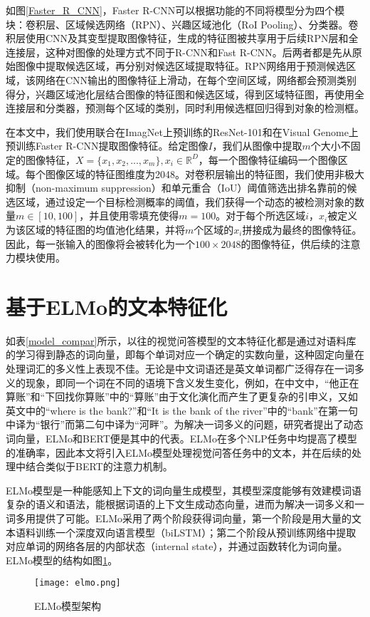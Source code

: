如图\ref{Faster_R_CNN}，Faster R-CNN可以根据功能的不同将模型分为四个模块：卷积层、区域候选网络（RPN）、兴趣区域池化（RoI Pooling）、分类器。卷积层使用CNN及其变型提取图像特征，生成的特征图被共享用于后续RPN层和全连接层，这种对图像的处理方式不同于R-CNN和Fast R-CNN。后两者都是先从原始图像中提取候选区域，再分别对候选区域提取特征。RPN网络用于预测候选区域，该网络在CNN输出的图像特征上滑动，在每个空间区域，网络都会预测类别得分，兴趣区域池化层结合图像的特征图和候选区域，得到区域特征图，再使用全连接层和分类器，预测每个区域的类别，同时利用候选框回归得到对象的检测框。

在本文中，我们使用联合在ImagNet上预训练的ResNet-101和在Visual Genome上预训练Faster R-CNN提取图像特征。给定图像$I$，我们从图像中提取$m$个大小不固定的图像特征，$X=\{x_1, x_2, ..., x_m\}, x_i \in \mathbb{R}^D$，每一个图像特征编码一个图像区域。每个图像区域的特征图维度为2048。对卷积层输出的特征图，我们使用非极大抑制（non-maximum suppression）和单元重合（IoU）阈值筛选出排名靠前的候选区域，通过设定一个目标检测概率的阈值，我们获得一个动态的被检测对象的数量$m \in [10,100]$，并且使用零填充使得$m=100$。对于每个所选区域$i$，$x_i$被定义为该区域的特征图的均值池化结果，并将$m$个区域的$x_i$拼接成为最终的图像特征。因此，每一张输入的图像将会被转化为一个$100\times 2048$的图像特征，供后续的注意力模块使用。

\section{基于ELMo的文本特征化}

如表\ref{model_compar}所示，以往的视觉问答模型的文本特征化都是通过对语料库的学习得到静态的词向量，即每个单词对应一个确定的实数向量，这种固定向量在处理词汇的多义性上表现不佳。无论是中文词语还是英文单词都广泛得存在一词多义的现象，即同一个词在不同的语境下含义发生变化，例如，在中文中，“他正在算账”和“下回找你算账”中的“算账”由于文化演化而产生了更复杂的引申义，又如英文中的“where is the bank?”和“It is the bank of the river”中的“bank”在第一句中译为“银行”而第二句中译为“河畔”。为解决一词多义的问题，研究者提出了动态词向量，ELMo和BERT便是其中的代表。ELMo在多个NLP任务中均提高了模型的准确率，因此本文将引入ELMo模型处理视觉问答任务中的文本，并在后续的处理中结合类似于BERT的注意力机制。

ELMo模型是一种能感知上下文的词向量生成模型，其模型深度能够有效建模词语复杂的语义和语法，能根据词语的上下文生成动态向量，进而为解决一词多义和一词多用提供了可能。ELMo采用了两个阶段获得词向量，第一个阶段是用大量的文本语料训练一个深度双向语言模型（biLSTM）；第二个阶段从预训练网络中提取对应单词的网络各层的内部状态（internal state），并通过函数转化为词向量。ELMo模型的结构如图\ref{elmo}。
\begin{figure}[H]
	\texttt{[image: elmo.png]}
	\caption{ELMo模型架构}
	\label{elmo}
\end{figure}

